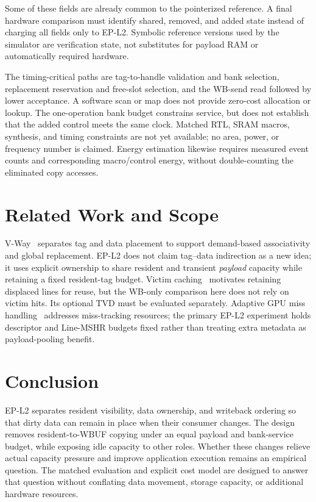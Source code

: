 \documentclass[conference,letterpaper]{IEEEtran}
\newcommand{\epl}{EP-L2}
\begin{document}
Some of these fields are already common to the pointerized reference. A final hardware comparison must identify shared, removed, and added state instead of charging all fields only to \epl{}. Symbolic reference versions used by the simulator are verification state, not substitutes for payload RAM or automatically required hardware.

The timing-critical paths are tag-to-handle validation and bank selection, replacement reservation and free-slot selection, and the WB-send read followed by lower acceptance. A software scan or map does not provide zero-cost allocation or lookup. The one-operation bank budget constrains service, but does not establish that the added control meets the same clock. Matched RTL, SRAM macros, synthesis, and timing constraints are not yet available; no area, power, or frequency number is claimed. Energy estimation likewise requires measured event counts and corresponding macro/control energy, without double-counting the eliminated copy accesses.

\section{Related Work and Scope}
V-Way~\cite{vway} separates tag and data placement to support demand-based associativity and global replacement. \epl{} does not claim tag--data indirection as a new idea; it uses explicit ownership to share resident and transient \emph{payload} capacity while retaining a fixed resident-tag budget. Victim caching~\cite{victim} motivates retaining displaced lines for reuse, but the WB-only comparison here does not rely on victim hits. Its optional TVD must be evaluated separately. Adaptive GPU miss handling~\cite{dlmshr} addresses miss-tracking resources; the primary \epl{} experiment holds descriptor and Line-MSHR budgets fixed rather than treating extra metadata as payload-pooling benefit.

\section{Conclusion}
\epl{} separates resident visibility, data ownership, and writeback ordering so that dirty data can remain in place when their consumer changes. The design removes resident-to-WBUF copying under an equal payload and bank-service budget, while exposing idle capacity to other roles. Whether these changes relieve actual capacity pressure and improve application execution remains an empirical question. The matched evaluation and explicit cost model are designed to answer that question without conflating data movement, storage capacity, or additional hardware resources.
\end{document}
